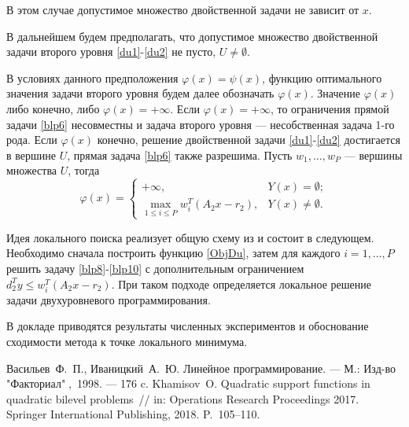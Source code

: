 В этом случае допустимое множество двойственной задачи не зависит от $x$. 

В дальнейшем будем предполагать, что допустимое множество двойственной задачи второго уровня \eqref{du1}-\eqref{du2} не пусто, $U\ne\emptyset$.

В условиях данного предположения $\varphi(x)=\psi(x)$, функцию оптимального значения задачи второго уровня будем далее обозначать $\varphi(x)$. 
Значение $\varphi(x)$ либо конечно, либо $\varphi(x)=+\infty$. Если $\varphi(x)=+\infty$, то ограничения прямой задачи \eqref{blp6} несовместны \cite{FPV_I_LP} и задача второго уровня --- несобственная задача 1-го рода. 
Если $\varphi(x)$ конечно, решение двойственной задачи \eqref{du1}-\eqref{du2} достигается в вершине $U$, прямая задача \eqref{blp6} также разрешима. Пусть $w_1,\ldots,w_P$ --- вершины множества $U$, тогда
\begin{equation}
\varphi(x)=\begin{cases}
+\infty, & Y(x)=\emptyset;\\
\max\limits_{1\leqslant i\leqslant P}w_i^T(A_2x-r_2), & Y(x)\ne\emptyset.
\end{cases}
\label{ObjDu}
\end{equation}

Идея локального поиска реализует общую схему из \cite{Khamisov} и состоит в следующем. Необходимо сначала построить функцию \eqref{ObjDu}, затем для каждого $i=1,\ldots,P$ решить задачу \eqref{blp8}-\eqref{blp10} 
с дополнительным ограничением $d^T_2y\leqslant w_i^T(A_2x-r_2)$. При таком подходе определяется локальное решение задачи двухуровневого программирования.

В докладе приводятся результаты численных экспериментов и обоснование сходимости метода к точке локального минимума.

\begin{thebibliography}{9} %
 Васильев~Ф.~П., Иваницкий~А.~Ю. Линейное программирование. --- М.: Изд-во "Факториал"$\;$,~1998. --- 176 c.
 Khamisov~O. Quadratic support functions in quadratic bilevel problems~// in: Operations Research Proceedings 2017. Springer International Publishing, 2018. P.~105--110.
\end{thebibliography}





%

